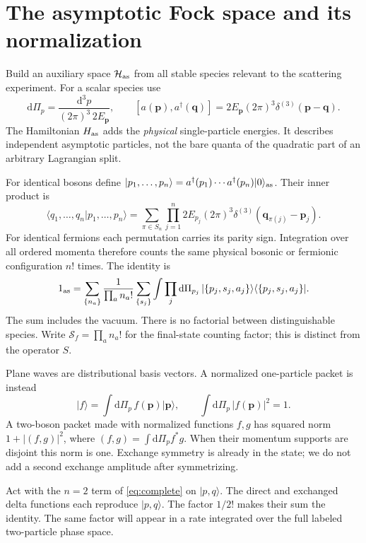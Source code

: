 \documentclass[11pt]{article}
\newcommand{\dd}{\mathrm d}
\newcommand{\vac}{\lvert0\rangle}
\newcommand{\ket}[1]{\lvert#1\rangle}
\newcommand{\bra}[1]{\langle#1\rvert}
\newcommand{\module}[1]{\clearpage\section{#1}}
\newcommand{\dPi}{\dd\Pi}
\newcommand{\cH}{\mathcal H}
\newcommand{\cS}{\mathcal S}
\begin{document}
\module{The asymptotic Fock space and its normalization}
Build an auxiliary space \(\cH_{\rm as}\) from all stable species relevant
to the scattering experiment. For a scalar species use
\begin{equation}
 \dPi_p=\frac{\dd^3p}{(2\pi)^3\,2E_{\bm p}},\qquad
 [a(\bm p),a^\dagger(\bm q)]=2E_{\bm p}(2\pi)^3\delta^{(3)}(\bm p-\bm q).
\end{equation}
The Hamiltonian \(H_{\rm as}\) adds the \emph{physical} single-particle
energies. It describes independent asymptotic particles, not the bare
quanta of the quadratic part of an arbitrary Lagrangian split.

For identical bosons define
\(\ket{p_1,\ldots,p_n}=a^\dagger(p_1)\cdots a^\dagger(p_n)\vac_{\rm as}\).
Their inner product is
\begin{equation}
 \langle q_1,\ldots,q_n|p_1,\ldots,p_n\rangle
 =\sum_{\pi\in S_n}\prod_{j=1}^n
 2E_{p_j}(2\pi)^3\delta^{(3)}(\bm q_{\pi(j)}-\bm p_j).
 \label{eq:multinorm}
\end{equation}
For identical fermions each permutation carries its parity sign.
Integration over all ordered momenta therefore counts the same physical
bosonic or fermionic configuration \(n!\) times. The identity is
\begin{equation}
 1_{\rm as}=\sum_{\{n_a\}}\frac{1}{\prod_a n_a!}
 \sum_{\{s_j\}}\int\prod_j\dPi_{p_j}\,
 \ket{\{p_j,s_j,a_j\}}\bra{\{p_j,s_j,a_j\}}.
 \label{eq:complete}
\end{equation}
The sum includes the vacuum. There is no factorial between distinguishable
species. Write \(\cS_f=\prod_a n_a!\) for the final-state counting factor;
this is distinct from the operator \(S\).

Plane waves are distributional basis vectors. A normalized one-particle
packet is instead
\begin{equation}
 \ket{f}=\int\dPi_p\,f(\bm p)\ket{\bm p},\qquad
 \int\dPi_p\,|f(\bm p)|^2=1.
\end{equation}
A two-boson packet made with normalized functions \(f,g\) has squared norm
\(1+|(f,g)|^2\), where \((f,g)=\int\dPi_p f^*g\). When their momentum
supports are disjoint this norm is one. Exchange symmetry is already in
the state; we do not add a second exchange amplitude after symmetrizing.

\begin{remarkbox}
Act with the \(n=2\) term of \eqref{eq:complete} on \(\ket{p,q}\).
The direct and exchanged delta functions each reproduce \(\ket{p,q}\).
The factor \(1/2!\) makes their sum the identity. The same factor will
appear in a rate integrated over the full labeled two-particle phase space.
\end{remarkbox}
\end{document}
